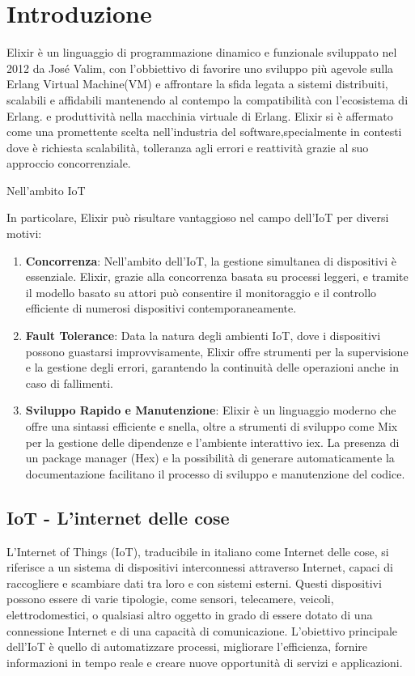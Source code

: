 \chapter{Introduzione}

Elixir è un linguaggio di programmazione dinamico e funzionale
sviluppato nel 2012 da José Valim,
con l'obbiettivo di favorire uno sviluppo più agevole
sulla Erlang Virtual Machine(VM) e affrontare la sfida legata
a sistemi distribuiti, scalabili e affidabili mantenendo al
contempo la compatibilità con l'ecosistema di Erlang.
e produttività nella macchinia virtuale di Erlang.
Elixir si è affermato come una promettente scelta
nell'industria del software,specialmente in contesti dove è
richiesta scalabilità, tolleranza agli errori e reattività 
grazie al suo approccio concorrenziale.

Nell'ambito IoT 

In particolare, Elixir può risultare vantaggioso nel
campo dell'IoT per diversi motivi:
\begin{enumerate}
	\item \textbf{Concorrenza}: Nell'ambito dell'IoT, la gestione
	simultanea di dispositivi è essenziale.
	Elixir, grazie alla concorrenza basata su processi leggeri,
	e tramite il modello basato su attori può consentire il monitoraggio
	e il controllo efficiente di numerosi dispositivi contemporaneamente.
	\item \textbf{Fault Tolerance}: 
	Data la natura degli ambienti IoT, dove i dispositivi possono
	guastarsi improvvisamente, Elixir offre strumenti per la supervisione
	e la gestione degli errori, garantendo la continuità delle operazioni
	anche in caso di fallimenti.
	\item \textbf{Sviluppo Rapido e Manutenzione}:
	Elixir è un linguaggio moderno che offre una sintassi efficiente e snella,
	oltre a strumenti di sviluppo come Mix per la gestione delle dipendenze
	e l'ambiente interattivo iex. La presenza di un package manager (Hex)\cite{Hex15:online}
	e la possibilità di generare automaticamente la documentazione
	facilitano il processo di sviluppo e manutenzione del codice.
	
\end{enumerate}

\section{IoT - L'internet delle cose}

L'Internet of Things (IoT),
traducibile in italiano come Internet delle cose,
si riferisce a un sistema di dispositivi interconnessi
attraverso Internet, capaci di raccogliere e scambiare
dati tra loro e con sistemi esterni.
Questi dispositivi possono essere di varie tipologie,
come sensori, telecamere, veicoli, elettrodomestici,
o qualsiasi altro oggetto in grado di essere dotato
di una connessione Internet e di una capacità di comunicazione.
L'obiettivo principale dell'IoT è quello di automatizzare processi,
migliorare l'efficienza, fornire informazioni in tempo reale
e creare nuove opportunità di servizi e applicazioni.

